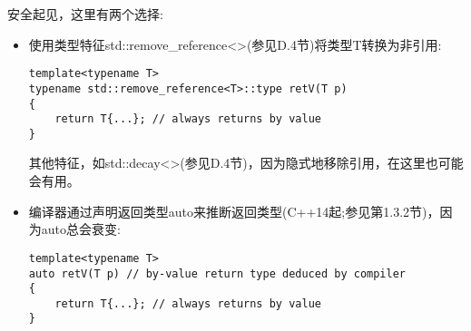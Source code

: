 安全起见，这里有两个选择:

\begin{itemize}
\item 
使用类型特征std::remove\_reference<>(参见D.4节)将类型T转换为非引用:

\begin{lstlisting}[style=styleCXX]
template<typename T>
typename std::remove_reference<T>::type retV(T p)
{
	return T{...}; // always returns by value
}
\end{lstlisting}

其他特征，如std::decay<>(参见D.4节)，因为隐式地移除引用，在这里也可能会有用。

\item 
编译器通过声明返回类型auto来推断返回类型(C++14起;参见第1.3.2节)，因为auto总会衰变:

\begin{lstlisting}[style=styleCXX]
template<typename T>
auto retV(T p) // by-value return type deduced by compiler
{
	return T{...}; // always returns by value
}
\end{lstlisting}

\end{itemize}


















